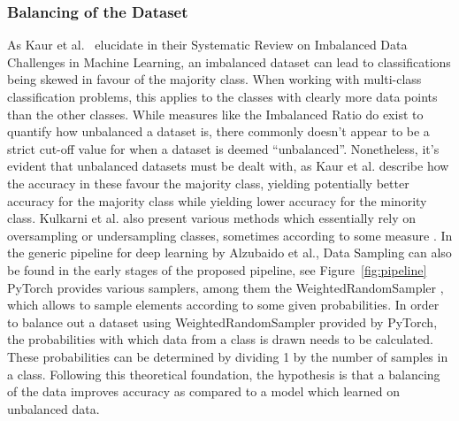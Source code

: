 \subsubsection{Balancing of the Dataset}\label{balancingtheory}
As Kaur et al\@.~\citep{kaurbalancing} elucidate in their Systematic Review on Imbalanced Data Challenges
in Machine Learning, an imbalanced dataset can lead to classifications being skewed in favour of the majority class. When working with multi-class classification problems, this applies to the classes with clearly more data points than the other classes. While measures like the Imbalanced Ratio \citep{kulkarni2020foundations} do exist to quantify how unbalanced a dataset is, there commonly doesn't appear to be a strict cut-off value for when a dataset is deemed ``unbalanced''. Nonetheless, it's evident that unbalanced datasets must be dealt with, as Kaur et al\@. describe how the accuracy in these favour the majority class, yielding potentially better accuracy for the majority class while yielding lower accuracy for the minority class. Kulkarni et al\@. also present various methods which essentially rely on oversampling or undersampling classes, sometimes according to some measure \citep{kulkarni2020foundations}. In the generic pipeline for deep learning by Alzubaido et al., Data Sampling can also be found in the early stages of the proposed pipeline, see Figure~\ref{fig:pipeline} PyTorch provides various samplers, among them the WeightedRandomSampler \citep{pytorchTorchutilsdatax2014}, which allows to sample elements according to some given probabilities. In order to balance out a dataset using WeightedRandomSampler provided by PyTorch, the probabilities with which data from a class is drawn needs to be calculated. These probabilities can be determined by dividing 1 by the number of samples in a class. Following this theoretical foundation, the hypothesis is that a balancing of the data improves accuracy as compared to a model which learned on unbalanced data.


